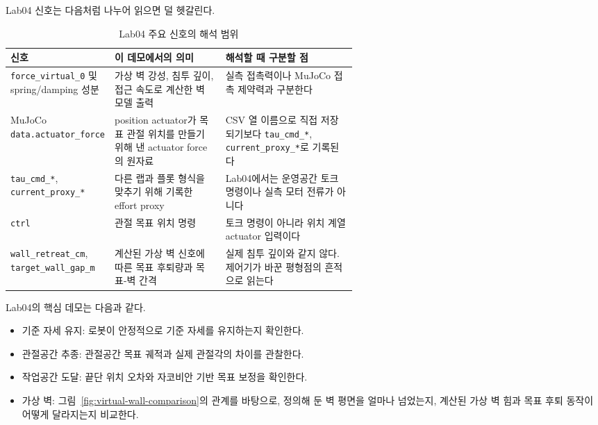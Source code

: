 Lab04 신호는 다음처럼 나누어 읽으면 덜 헷갈린다.

\begin{table}[!htbp]
  \centering
  \caption{Lab04 주요 신호의 해석 범위}
  \small
  \setlength{\tabcolsep}{4pt}
  \renewcommand{\arraystretch}{1.12}
  \begin{tabularx}{\linewidth}{@{}>{\raggedright\arraybackslash}p{0.26\linewidth}>{\raggedright\arraybackslash}p{0.32\linewidth}>{\raggedright\arraybackslash}X@{}}
    \toprule
    신호 & 이 데모에서의 의미 & 해석할 때 구분할 점 \\
    \midrule
    \texttt{force\_virtual\_0} 및 spring/damping 성분 & 가상 벽 강성, 침투 깊이, 접근 속도로 계산한 벽 모델 출력 & 실측 접촉력이나 MuJoCo 접촉 제약력과 구분한다 \\
    MuJoCo \texttt{data.actuator\_force} & position actuator가 목표 관절 위치를 만들기 위해 낸 actuator force의 원자료 & CSV 열 이름으로 직접 저장되기보다 \texttt{tau\_cmd\_*}, \texttt{current\_proxy\_*}로 기록된다 \\
    \texttt{tau\_cmd\_*}, \texttt{current\_proxy\_*} & 다른 랩과 플롯 형식을 맞추기 위해 기록한 effort proxy & Lab04에서는 운영공간 토크 명령이나 실측 모터 전류가 아니다 \\
    \texttt{ctrl} & 관절 목표 위치 명령 & 토크 명령이 아니라 위치 계열 actuator 입력이다 \\
    \texttt{wall\_retreat\_cm}, \texttt{target\_wall\_gap\_m} & 계산된 가상 벽 신호에 따른 목표 후퇴량과 목표-벽 간격 & 실제 침투 깊이와 같지 않다. 제어기가 바꾼 평형점의 흔적으로 읽는다 \\
    \bottomrule
  \end{tabularx}
\end{table}

Lab04의 핵심 데모는 다음과 같다.
\begin{itemize}
  \item 기준 자세 유지: 로봇이 안정적으로 기준 자세를 유지하는지 확인한다.
  \item 관절공간 추종: 관절공간 목표 궤적과 실제 관절각의 차이를 관찰한다.
  \item 작업공간 도달: 끝단 위치 오차와 자코비안 기반 목표 보정을 확인한다.
  \item 가상 벽: 그림~\ref{fig:virtual-wall-comparison}의 관계를 바탕으로, 정의해 둔 벽 평면을 얼마나 넘었는지, 계산된 가상 벽 힘과 목표 후퇴 동작이 어떻게 달라지는지 비교한다.
\end{itemize}

